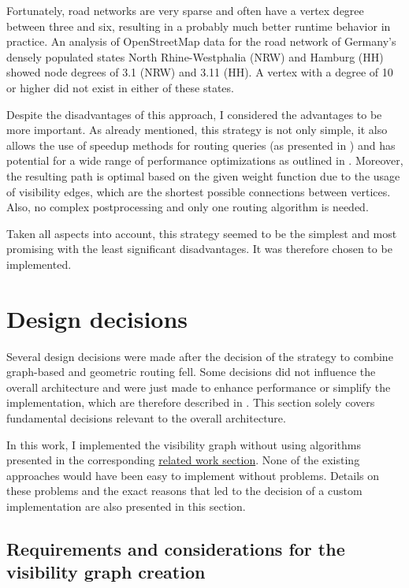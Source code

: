 		Fortunately, road networks are very sparse and often have a vertex degree between three and six\cite{zhao-analysis-osm-bejing}\cite{boeing-osmnx}, resulting in a probably much better runtime behavior in practice.
		An analysis of OpenStreetMap data for the road network of Germany's densely populated states North Rhine-Westphalia (NRW) and Hamburg (HH) showed node degrees of 3.1 (NRW) and 3.11 (HH).
		A vertex with a degree of 10 or higher did not exist in either of these states.
		
		Despite the disadvantages of this approach, I considered the advantages to be more important.
		As already mentioned, this strategy is not only simple, it also allows the use of speedup methods for routing queries (as presented in ) and has potential for a wide range of performance optimizations as outlined in .
		Moreover, the resulting path is optimal based on the given weight function due to the usage of visibility edges, which are the shortest possible connections between vertices. 
		Also, no complex postprocessing and only one routing algorithm is needed.
		
		Taken all aspects into account, this strategy seemed to be the simplest and most promising with the least significant disadvantages.
		It was therefore chosen to be implemented.

\section{Design decisions}
\label{sec:design-decisions}

	Several design decisions were made after the decision of the strategy to combine graph-based and geometric routing fell.
	Some decisions did not influence the overall architecture and were just made to enhance performance or simplify the implementation, which are therefore described in .
	This section solely covers fundamental decisions relevant to the overall architecture.
	
	In this work, I implemented the visibility graph without using algorithms presented in the corresponding \hyperref[subsec:related-work:visibility-graph]{related work section}.
	None of the existing approaches would have been easy to implement without problems.
	Details on these problems and the exact reasons that led to the decision of a custom implementation are also presented in this section.
	
	\subsection{Requirements and considerations for the visibility graph creation}
	
